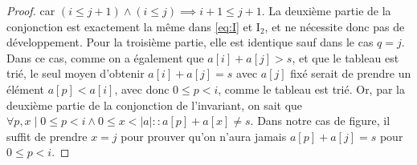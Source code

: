 \documentclass{elsarticle}
\newcommand{\abs}[1]{\left\lvert#1\right\lvert}
\begin{document}
\begin{minipage}[c]{0.65\textwidth}
\begin{proof}
car $(i \le j+1) \land (i \le j) \implies i+1 \le j+1$.
La deuxième partie de la conjonction est exactement la même dans \ref{eq:I} et I$_2$,
et ne nécessite donc pas de développement.
Pour la troisième partie, elle est identique sauf dans le cas $q = j$.
Dans ce cas, comme on a également que $a[i] + a[j] > s$,
et que le tableau est trié, le seul moyen d'obtenir $a[i] + a[j] = s$ avec $a[j]$ fixé serait de prendre un élément $a[p] < a[i]$, avec donc $0 \le p < i$, comme le tableau est trié.
Or, par la deuxième partie de la conjonction de l'invariant, on sait que $\forall p, x \mid 0 \le p < i \land 0 \le x < \abs{a} :: a[p] + a[x] \ne s$.
Dans notre cas de figure, il suffit de prendre $x = j$ pour prouver qu'on n'aura jamais $a[p] + a[j] = s$ pour $0 \le p < i$.
\end{proof}
\end{minipage}
\end{document}
